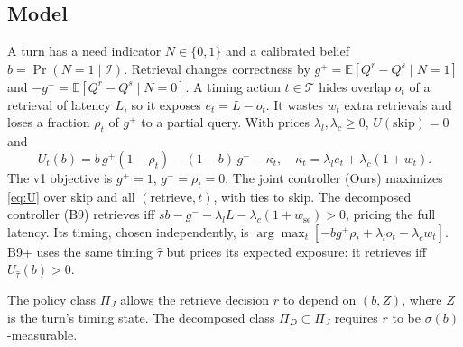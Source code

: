 %
\ifdefined\proposition\else\newtheorem{proposition}{Proposition}\fi
\ifdefined\lemma\else\newtheorem{lemma}{Lemma}\fi
\ifdefined\corollary\else\newtheorem{corollary}{Corollary}\fi
\ifdefined\remark\else\newtheorem{remark}{Remark}\fi

\subsection{Model}
A turn has a need indicator $N\in\{0,1\}$ and a calibrated belief
$b=\Pr(N=1\mid\mathcal I)$. Retrieval changes correctness by
$g^{+}=\mathbb E[Q^{r}-Q^{s}\mid N=1]$ and $-g^{-}=\mathbb E[Q^{r}-Q^{s}\mid N=0]$.
A timing action $t\in\mathcal T$ hides overlap $o_t$ of a retrieval of latency
$L$, so it exposes $e_t=L-o_t$. It wastes $w_t$ extra retrievals and loses a
fraction $\rho_t$ of $g^{+}$ to a partial query. With prices
$\lambda_l,\lambda_c\ge 0$, $U(\text{skip})=0$ and
\begin{equation}
U_t(b)=b\,g^{+}(1-\rho_t)-(1-b)\,g^{-}-\kappa_t,\quad
\kappa_t=\lambda_l e_t+\lambda_c(1+w_t).
\label{eq:U}
\end{equation}
The v1 objective is $g^{+}=1$, $g^{-}=\rho_t=0$. The joint controller (Ours)
maximizes \eqref{eq:U} over skip and all $(\text{retrieve},t)$, with ties to
skip. The decomposed controller (B9) retrieves iff
$s b-g^{-}-\lambda_lL-\lambda_c(1+w_{\mathrm{se}})>0$, pricing the full
latency. Its timing, chosen independently, is
$\arg\max_t[-bg^{+}\rho_t+\lambda_lo_t-\lambda_cw_t]$. B9+ uses the same
timing $\hat\tau$ but prices its expected exposure: it retrieves iff
$U_{\hat\tau}(b)>0$.

The policy class $\Pi_J$ allows the retrieve decision $r$ to depend on
$(b,Z)$, where $Z$ is the turn's timing state. The decomposed class
$\Pi_D\subset\Pi_J$ requires $r$ to be $\sigma(b)$-measurable.

